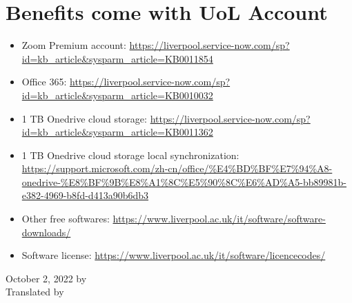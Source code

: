 \section{Benefits come with UoL Account}
\label{sec.fuli_liverpool}
\begin{itemize}
    \item Zoom Premium account: \url{https://liverpool.service-now.com/sp?id=kb_article&sysparm_article=KB0011854}
    \item Office 365: \url{https://liverpool.service-now.com/sp?id=kb_article&sysparm_article=KB0010032}
    \item 1 TB Onedrive cloud storage:  \url{https://liverpool.service-now.com/sp?id=kb_article&sysparm_article=KB0011362}
    \item 1 TB Onedrive cloud storage local synchronization: \url{https://support.microsoft.com/zh-cn/office/%E4%BD%BF%E7%94%A8-onedrive-%E8%BF%9B%E8%A1%8C%E5%90%8C%E6%AD%A5-bb89981b-e382-4969-b8fd-d413a90b6db3}
    \item Other free softwares: \url{https://www.liverpool.ac.uk/it/software/software-downloads/}
    \item Software license: \url{https://www.liverpool.ac.uk/it/software/licencecodes/}
\end{itemize}

\begin{flushright}
    October 2, 2022 by \Wu \\
    Translated by \Shiyao
    \end{flushright}